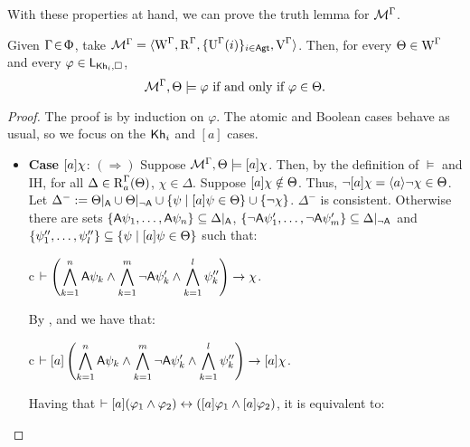 \medskip

With these properties at hand, we can prove the truth lemma for $\mathcal{M}^\Gamma$.

\medskip

\begin{lemma}\label{tlm:cm-ults-lkhi}
Given $\Gamma \!\in\! \Upphi$, take $\mathcal{M}^\Gamma = \langle \operatorname{W}^\Gamma, \operatorname{R}^\Gamma, \{ \operatorname{U}^\Gamma(i) \}_{i \in {\rm \sf Agt}}, \operatorname{V}^\Gamma \rangle$. Then, for every $\Theta \in \operatorname{W}^\Gamma$ and every $\varphi \in \mathsf{L}_{{\sf Kh}_i,\square}$,  %
\[
\mathcal{M}^\Gamma, \Theta \models \varphi \mbox{ if and only if } \varphi \in \Theta.
\]
\end{lemma}
\begin{proof}
The proof is by induction on $\varphi$.
The atomic and Boolean cases behave as usual, so we focus on the ${\sf Kh}_i$ and $[a]$ cases.

\begin{itemize}
\item \textbf{Case $[a]\chi$}: $(\Rightarrow)$ Suppose $\mathcal{M}^\Gamma,\Theta \models [a]\chi$. Then, by the definition of $\models$ and IH, for all $\Delta \in \operatorname{R}^\Gamma_a(\Theta)$, $\chi \in \Delta$.
Suppose $[a]\chi \notin \Theta$. Thus, $\neg[a]\chi = \langle a \rangle\neg\chi \in \Theta$.
Let $\Delta^- := \Theta\vert_{{\sf A}} \cup \Theta\vert_{\lnot{\sf A}} \cup \{ \psi \mid [a]\psi \in \Theta \} \cup \{ \neg\chi \}$. $\Delta^-$ is consistent.
Otherwise there are sets $\{ {\sf A}\psi_1, \ldots, {\sf A}\psi_n \} \subseteq \Delta\vert_{{\sf A}}$, $\{ \lnot {\sf A}\psi'_1, \ldots, \lnot {\sf A}\psi'_m \} \subseteq \Delta\vert_{\lnot{\sf A}}$ and $\{ \psi''_1, \ldots, \psi''_l \} \subseteq \{ \psi \mid [a]\psi \in \Theta \}$ such that:

\begin{ctabular}{c}
$\vdash
\displaystyle
\left( \bigwedge_{k=1}^{n} {\sf A}\psi_k \land \bigwedge_{k=1}^{m} \lnot {\sf A}\psi'_k \land \bigwedge_{k=1}^{l} \psi''_k \right)
\rightarrow \chi$.
\end{ctabular}

By ,  and  we have that:

\begin{ctabular}{c}
$\vdash
\displaystyle
[a] \left( \bigwedge_{k=1}^{n} {\sf A}\psi_k \land \bigwedge_{k=1}^{m} \lnot {\sf A}\psi'_k \land \bigwedge_{k=1}^{l} \psi''_k \right)
\rightarrow [a] \chi$.
\end{ctabular}

Having that $\vdash [a](\varphi_1 \wedge \varphi_2) \leftrightarrow ([a] \varphi_1 \wedge [a] \varphi_2)$, it is equivalent to:


\end{itemize}
\end{proof}
